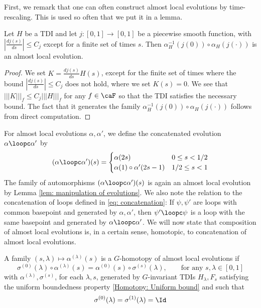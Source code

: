 First, we remark that one can often construct almost local evolutions by time-rescaling. This is used so often that we put it in a lemma.
\begin{lemma}\label{lem: time-rescaling almost local evolutions}
	Let $H$ be a TDI and let $j: [0,1]\to [0,1]$ be a piecewise smooth function, with  $|\frac{dj(s)}{ds}|\leq C_j$ except for a finite set of times $s$. Then $\alpha_H^{-1}(j(0))\circ\alpha_H(j(\cdot))$ is an almost local evolution.
\end{lemma}     
\begin{proof}
	We set $K=\frac{d j(s)}{ds} H(s)$, except for the finite set of times where the bound $|\frac{dj(s)}{ds}|\leq C_j$ does not hold, where we set $K(s)=0$.
	We see that $|||K|||_f\leq C_j |||H|||_f $ for any $f\in \caF$ so that the TDI satisfies the necessary bound. The fact that it generates the family $\alpha^{-1}_H(j(0))\circ\alpha_H(j(\cdot))$  follows from direct computation.      
\end{proof}
For almost local evolutions $\alpha,\alpha'$, we define the concatenated evolution $\alpha\loopc \alpha'$ 
by 
%
\begin{equation}\label{concatenation}
	(\alpha\loopc \alpha')(s)= \begin{cases} \alpha(2s) & 0\leq s <1/2 \\
		\alpha(1)\circ\alpha'(2s-1)   & 1/2\leq s <1   
	\end{cases}
\end{equation}
%
The family of automorphisms $(\alpha\loopc \alpha')(s)$ is again an almost local evolution by Lemma \ref{lem: manipulation of evolutions}.    
We also note the relation to the concatenation of loops defined in \eqref{eq: concatenation}:  If $\psi,\psi'$ are loops with common basepoint and generated by $\alpha,\alpha'$, then $\psi' \loopc \psi$ is a loop with the same basepoint and generated by $\alpha\loopc \alpha'$. 
We will now state that composition of almost local evolutions is, in a certain  sense, homotopic, to concatenation of almost local evolutions.
\begin{definition}\label{def: homo of ale}
	A family $(s,\lambda)\mapsto \alpha^{(\lambda)}(s)$ is a $G$-homotopy of almost local evolutions if 
	$$
	\sigma^{(0)}(\lambda) \circ \alpha^{(\lambda)}(s) 
	=  \alpha^{(0)}(s) \circ \sigma^{(s)}(\lambda)  ,\qquad \text{for any $s,\lambda \in [0,1]$}
	$$  
	with $\alpha^{(\lambda)},\sigma^{(s)}$, for each $\lambda,s$,  generated by $G$-invariant TDIs $H_\lambda, F_s$ satisfying the uniform boundedness property \eqref{Homotopy: Uniform bound} and such that 
	\begin{equation}\label{eq: extra condition homotopy}
		\sigma^{(0)}(\lambda)=\sigma^{(1)}(\lambda)=\Id
	\end{equation}
\end{definition}
